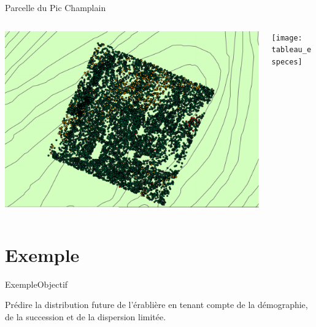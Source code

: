 \documentclass{eecslides}
\begin{document}
	\begin{frame}{Parcelle du Pic Champlain}
		\begin{columns}
			\begin{column}{0.6\textwidth}
				\begin{center}
					\includegraphics[height=0.5\textheight]{carte_arbres}
				\end{center}
			\end{column}
			\begin{column}{0.4\textwidth}
				\begin{center}
					\texttt{[image: tableau\_especes]}
				\end{center}
			\end{column}
		\end{columns}	    	
	\end{frame}

\section{Exemple}


	\begin{frame}{Exemple}{Objectif}
		\begin{center}
			Prédire la distribution future de l'érablière en tenant compte de la démographie, de la succession et de la dispersion limitée.
		\end{center}
	\end{frame}
\end{document}
